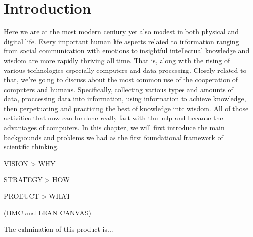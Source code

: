\chapter{Introduction}
\label{chap:introduction}

Here we are at the most modern century yet also modest in both physical and digital life.
Every important human life aspects related to information ranging from social communication with emotions to insightful intellectual knowledge and wisdom are more rapidly thriving all time.
That is, along with the rising of various technologies especially computers and data processing.
Closely related to that, we're going to discuss about the most common use of the cooperation of computers and humans.
Specifically, collecting various types and amounts of data, proccessing data into information, using information to achieve knowledge, then perpetuating and practicing the best of knowledge into wisdom.
All of those activities that now can be done really fast with the help and because the advantages of computers.
In this chapter, we will first introduce the main backgrounds and problems we had as the first foundational framework of scientific thinking.

VISION > WHY

STRATEGY > HOW

PRODUCT > WHAT

(BMC and LEAN CANVAS)

The culmination of this product is...

